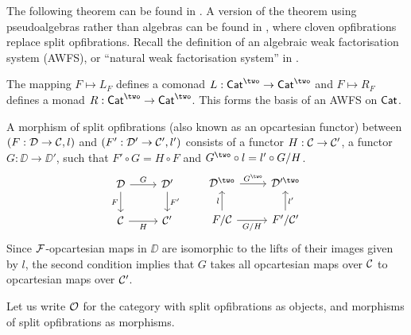 The following theorem can be found in \cite[2.13]{garner2008}. %
A version of the theorem using pseudoalgebras rather than
algebras can be found in \cite{street1974},
where cloven opfibrations replace split opfibrations.
Recall the definition of an algebraic weak factorisation system (AWFS),
or ``natural weak factorisation system'' in \cite{garner2008}.
\begin{theorem}\label{thm:lari-opfib-awfs}
  The mapping $F \mapsto L_F$ defines a comonad
  $L : \Cat^\two \to \Cat^\two$
  and $F \mapsto R_F$ defines a monad $R : \Cat^\two \to \Cat^\two$.
  This forms the basis of
  an AWFS on $\mathsf{Cat}$.
\end{theorem}

\begin{definition}\label{def:morphism-split-opfibration}
A morphism of split opfibrations
(also known as an opcartesian functor) between
$(F : \mathcal{D} \to \mathcal{C},l)$ and $(F' : \mathcal{D}' \to \mathcal{C}',l')$
consists of a functor $H : \mathcal{C} \to \mathcal{C}'$,
a functor $G : \DD \to \DD'$,
such that $F' \circ G = H \circ F$
and $G^\two \circ l = l' \circ G / H$.
\[ 
  \begin{tikzcd}
    \DD & {\DD'} \\
    \CC & \CC'
    \arrow["G", from=1-1, to=1-2]
    \arrow["F"', from=1-1, to=2-1]
    \arrow["H"', from=2-1, to=2-2]
    \arrow["{F'}", from=1-2, to=2-2]
  \end{tikzcd}
  \quad
  \quad \begin{tikzcd}
	{\DD^\two} & {\DD'^\two} \\
	{F / \CC} & {F' / \CC'}
	\arrow["{G^\two}", from=1-1, to=1-2]
	\arrow["l", from=2-1, to=1-1]
	\arrow["{G / H}"', from=2-1, to=2-2]
	\arrow["{l'}"', from=2-2, to=1-2]
\end{tikzcd} \]
Since $\mathcal{F}$-opcartesian maps in $\DD$ are
isomorphic to the lifts of their images given by $l$,
the second condition implies that
$G$ takes all opcartesian maps over $\mathcal{C}$ to opcartesian maps over $\mathcal{C}'$.
\end{definition}

Let us write ${\mathcal{O}}$ for the category with
split opfibrations as objects,
and morphisms of split opfibrations as morphisms.

